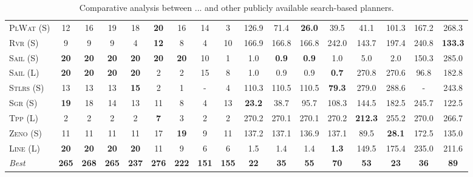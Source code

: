 \documentclass[11pt]{article}
\begin{document}
\begin{table}[tb]
{\begin{tabular}{|l||cccccccc||cccccccc||}
\textsc{PlWat} (S)&12&16&19&18&\textbf{20}&16&14&3&126.9&71.4&\textbf{26.0}&39.5&41.1&101.3&167.2&268.3\\
\textsc{Rvr} (S)&9&9&9&4&\textbf{12}&8&4&10&166.9&166.8&166.8&242.0&143.7&197.4&240.8&\textbf{133.3}\\
\textsc{Sail} (S)&\textbf{20}&\textbf{20}&\textbf{20}&\textbf{20}&\textbf{20}&\textbf{20}&10&1&1.0&\textbf{0.9}&\textbf{0.9}&1.0&5.0&2.0&150.3&285.0\\
\textsc{Sail} (L)&\textbf{20}&\textbf{20}&\textbf{20}&\textbf{20}&2&2&15&8&1.0&0.9&0.9&\textbf{0.7}&270.8&270.6&96.8&182.8\\
\textsc{Stlrs} (S)&13&13&13&\textbf{15}&2&1&-&4&110.3&110.5&110.5&\textbf{79.3}&279.0&288.6&-&243.8\\
\textsc{Sgr} (S)&\textbf{19}&18&14&13&11&8&4&13&\textbf{23.2}&38.7&95.7&108.3&144.5&182.5&245.7&122.5\\
\textsc{Tpp} (L)&2&2&2&2&\textbf{7}&3&2&2&270.2&270.1&270.1&270.2&\textbf{212.3}&255.2&270.0&266.7\\
\textsc{Zeno} (S)&11&11&11&11&17&\textbf{19}&9&11&137.2&137.1&136.9&137.1&89.5&\textbf{28.1}&172.5&135.0\\
\textsc{Line} (L)&\textbf{20}&\textbf{20}&\textbf{20}&\textbf{20}&11&9&6&6&1.5&1.4&1.4&\textbf{1.3}&149.5&175.4&235.0&211.6
\\\hline
\textit{Best}&\textbf{265}&\textbf{268}&\textbf{265}&\textbf{237}&\textbf{276}&\textbf{222}&\textbf{151}&\textbf{155}&\textbf{22}&\textbf{35}&\textbf{55}&\textbf{70}&\textbf{53}&\textbf{23}&\textbf{36}&\textbf{89}\\\hline

        \end{tabular}}
        \caption{Comparative analysis between ... and other publicly available search-based planners.}
        \label{tab:search}
        \end{table}
        
\end{document}
